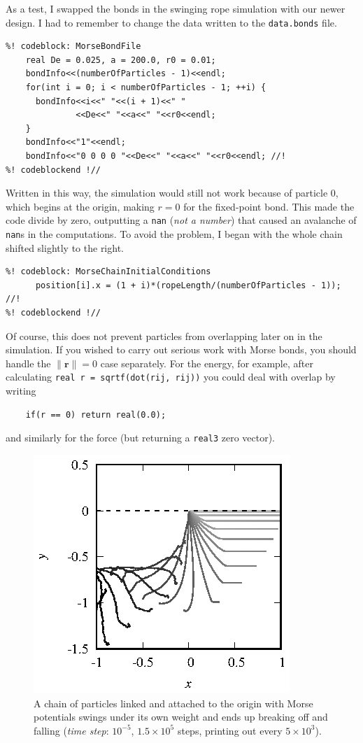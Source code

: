 As a test, I swapped the bonds in the swinging rope simulation with our newer 
design. I had to remember to change the data written to the \texttt{data.bonds} 
file.
\begin{lstlisting}
%! codeblock: MorseBondFile
    real De = 0.025, a = 200.0, r0 = 0.01;
    bondInfo<<(numberOfParticles - 1)<<endl;
    for(int i = 0; i < numberOfParticles - 1; ++i) {
      bondInfo<<i<<" "<<(i + 1)<<" "
              <<De<<" "<<a<<" "<<r0<<endl;
    }
    bondInfo<<"1"<<endl;
    bondInfo<<"0 0 0 0 "<<De<<" "<<a<<" "<<r0<<endl; //!
%! codeblockend !//
\end{lstlisting}
Written in this way, the simulation would still not work because of particle 
$0$, which begins at the origin, making $r = 0$ for the fixed-point bond. This
made the code divide by zero, outputting a \texttt{nan} (\textit{not a number})
that caused an avalanche of \texttt{nan}s in the computations. To avoid the
problem, I began with the whole chain shifted slightly to the right.
\begin{lstlisting}
%! codeblock: MorseChainInitialConditions
      position[i].x = (1 + i)*(ropeLength/(numberOfParticles - 1)); //!
%! codeblockend !//
\end{lstlisting}
Of course, this does not prevent particles from overlapping later on in the 
simulation. If you wished to carry out serious work with Morse bonds, you should 
handle the $\|\mathbf{r}\| = 0$ case separately. For the energy, for example, 
after calculating \texttt{real r = sqrtf(dot(rij, rij))} you could deal with
overlap by writing
\begin{lstlisting}
    if(r == 0) return real(0.0);
\end{lstlisting}
and similarly for the force (but returning a \texttt{real3} zero vector).

\begin{figure}
  \centering
  \includegraphics[width = 0.6 \textwidth]{figures/MorseChain.eps}
  \caption{\label{MorseChain} A chain of particles linked and attached to the 
           origin with Morse potentials swings under its own weight and ends up 
           breaking off and falling (\textit{time step}: $10^{-5}$, 
           $1.5 \times 10^5$ steps, printing out every $5 \times 10^3$).}
\end{figure}

